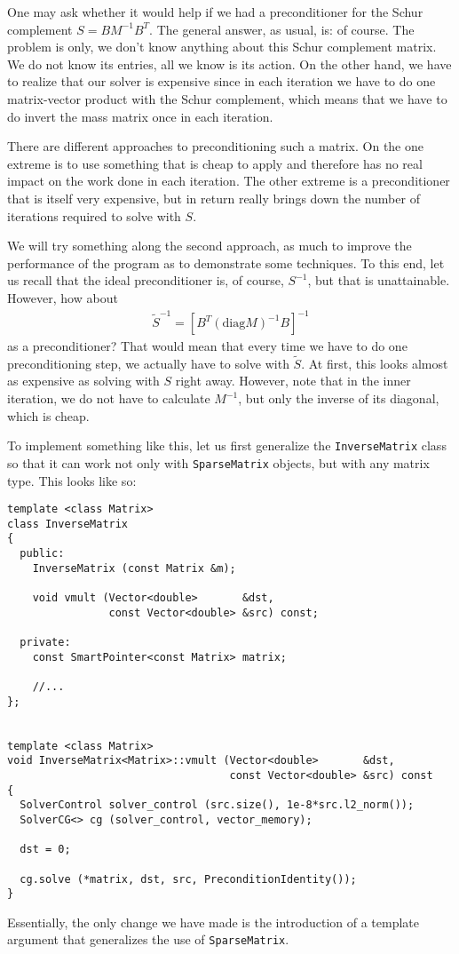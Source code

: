 \documentclass{article}
\begin{document}
One may ask whether it would help if we had a preconditioner for the Schur
complement $S=BM^{-1}B^T$. The general answer, as usual, is: of course. The
problem is only, we don't know anything about this Schur complement matrix. We
do not know its entries, all we know is its action. On the other hand, we have
to realize that our solver is expensive since in each iteration we have to do
one matrix-vector product with the Schur complement, which means that we have
to do invert the mass matrix once in each iteration.

There are different approaches to preconditioning such a matrix. On the one
extreme is to use something that is cheap to apply and therefore has no real
impact on the work done in each iteration. The other extreme is a
preconditioner that is itself very expensive, but in return really brings down
the number of iterations required to solve with $S$. 

We will try something along the second approach, as much to improve the
performance of the program as to demonstrate some techniques. To this end, let
us recall that the ideal preconditioner is, of course, $S^{-1}$, but that is
unattainable. However, how about
\begin{align*}
  \tilde S^{-1} = [B^T (\text{diag}M)^{-1}B]^{-1}
\end{align*}
as a preconditioner? That would mean that every time we have to do one
preconditioning step, we actually have to solve with $\tilde S$. At first,
this looks almost as expensive as solving with $S$ right away. However, note
that in the inner iteration, we do not have to calculate $M^{-1}$, but only
the inverse of its diagonal, which is cheap.

To implement something like this, let us first generalize the
\texttt{InverseMatrix} class so that it can work not only with
\texttt{SparseMatrix} objects, but with any matrix type. This looks like so:
\begin{verbatim}
template <class Matrix>
class InverseMatrix
{
  public:
    InverseMatrix (const Matrix &m);

    void vmult (Vector<double>       &dst,
                const Vector<double> &src) const;

  private:
    const SmartPointer<const Matrix> matrix;

    //...
};


template <class Matrix>
void InverseMatrix<Matrix>::vmult (Vector<double>       &dst,
                                   const Vector<double> &src) const
{
  SolverControl solver_control (src.size(), 1e-8*src.l2_norm());
  SolverCG<> cg (solver_control, vector_memory);

  dst = 0;
  
  cg.solve (*matrix, dst, src, PreconditionIdentity());        
}
\end{verbatim}
Essentially, the only change we have made is the introduction of a template
argument that generalizes the use of \texttt{SparseMatrix}.
\end{document}
